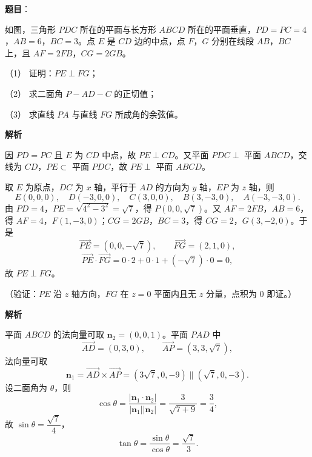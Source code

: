 \begin{answer}

\textbf{题目}：

如图，三角形 \(PDC\) 所在的平面与长方形 \(ABCD\) 所在的平面垂直，\(PD=PC=4\)，\(AB=6\)，\(BC=3\)。点 \(E\) 是 \(CD\) 边的中点，点 \(F\)，\(G\) 分别在线段 \(AB\)，\(BC\) 上，且 \(AF=2FB\)，\(CG=2GB\)。

（1） 证明：\(PE\perp FG\)；

（2） 求二面角 \(P-AD-C\) 的正切值；

（3） 求直线 \(PA\) 与直线 \(FG\) 所成角的余弦值。
\nopagebreak[4]
\begin{center}\end{center}
\nopagebreak[4]
\textbf{解析}


因 \(PD=PC\) 且 \(E\) 为 \(CD\) 中点，故 \(PE\perp CD\)。又平面 \(PDC\perp\) 平面 \(ABCD\)，交线为 \(CD\)，\(PE\subset\) 平面 \(PDC\)，故 \(PE\perp\) 平面 \(ABCD\)。

取 \(E\) 为原点，\(DC\) 为 \(x\) 轴，平行于 \(AD\) 的方向为 \(y\) 轴，\(EP\) 为 \(z\) 轴，则
\nopagebreak[4]
\[
E(0,0,0),\quad D(-3,0,0),\quad C(3,0,0),\quad B(3,-3,0),\quad A(-3,-3,0).
\]
由 \(PD=4\)，\(PE=\sqrt{4^2-3^2}=\sqrt7\)，得 \(P(0,0,\sqrt7)\)。又 \(AF=2FB\)，\(AB=6\)，得 \(AF=4\)，\(F(1,-3,0)\)；\(CG=2GB\)，\(BC=3\)，得 \(CG=2\)，\(G(3,-2,0)\)。于是
\nopagebreak[4]
\[
\overrightarrow{PE}=(0,0,-\sqrt7),\qquad \overrightarrow{FG}=(2,1,0),
\]
\nopagebreak[4]
\[
\overrightarrow{PE}\cdot\overrightarrow{FG}=0\cdot2+0\cdot1+(-\sqrt7)\cdot0=0,
\]
故 \(PE\perp FG\)。

（验证：\(PE\) 沿 \(z\) 轴方向，\(FG\) 在 \(z=0\) 平面内且无 \(z\) 分量，点积为 \(0\) 即证。）


\textbf{解析}

平面 \(ABCD\) 的法向量可取 \(\boldsymbol{n}_2=(0,0,1)\)。平面 \(PAD\) 中
\nopagebreak[4]
\[
\overrightarrow{AD}=(0,3,0),\qquad \overrightarrow{AP}=(3,3,\sqrt7),
\]
法向量可取
\nopagebreak[4]
\[
\boldsymbol{n}_1=\overrightarrow{AD}\times\overrightarrow{AP}=(3\sqrt7,0,-9)\parallel(\sqrt7,0,-3).
\]
设二面角为 \(\theta\)，则
\nopagebreak[4]
\[
\cos\theta=\frac{|\boldsymbol{n}_1\cdot\boldsymbol{n}_2|}{|\boldsymbol{n}_1||\boldsymbol{n}_2|}
=\frac{3}{\sqrt{7+9}}=\frac34,
\]
故 \(\sin\theta=\dfrac{\sqrt7}{4}\)，
\nopagebreak[4]
\[
\tan\theta=\frac{\sin\theta}{\cos\theta}=\frac{\sqrt7}{3}.
\]


\end{answer}

